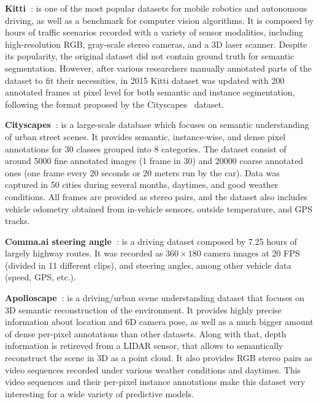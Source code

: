 \vspace*{0.1cm}\noindent\textbf{Kitti~\cite{Geiger2013}}: is one of the most popular datasets for mobile robotics and autonomous driving, as well as a benchmark for computer vision algorithms. It is composed by hours of traffic scenarios recorded with a variety of sensor modalities, including high-resolution RGB, gray-scale stereo cameras, and a 3D laser scanner. Despite its popularity, the original dataset did not contain ground truth for semantic segmentation. However, after various researchers manually annotated parts of the dataset to fit their necessities, in 2015 Kitti dataset was updated with 200 annotated frames at pixel level for both semantic and instance segmentation, following the format proposed by the Cityscapes~\cite{Cordts2016} dataset.

\vspace*{0.1cm}\noindent\textbf{Cityscapes~\cite{Cordts2016}}: is a large-scale database which focuses on semantic understanding of urban street scenes. It provides semantic, instance-wise, and dense pixel annotations for \num{30} classes grouped into \num{8} categories. The dataset consist of around \num{5000} fine annotated images (\num{1} frame in \num{30}) and \num{20000} coarse annotated ones (one frame every \num{20} seconds or \num{20} meters run by the car). Data was captured in \num{50} cities during several months, daytimes, and good weather conditions. All frames are provided as stereo pairs, and the dataset also includes vehicle odometry obtained from in-vehicle sensors, outside temperature, and GPS tracks.

\vspace*{0.1cm}\noindent\textbf{Comma.ai steering angle~\cite{Santana2016}}: is a driving dataset composed by \num{7.25} hours of largely highway routes. It was recorded as $360 \times 180$ camera images at 20 \ac{FPS} (divided in \num{11} different clips), and steering angles, among other vehicle data (speed, GPS, etc.).

\vspace*{0.1cm}\noindent\textbf{Apolloscape~\cite{Huang2018a}}: is a driving/urban scene understanding dataset that focuses on 3D semantic reconstruction of the environment. It provides highly precise information about location and 6D camera pose, as well as a much bigger amount of dense per-pixel annotations than other datasets. Along with that, depth information is retireved from a LIDAR sensor, that allows to semantically reconstruct the scene in 3D as a point cloud. It also provides RGB stereo pairs as video sequences recorded under various weather conditions and daytimes. This video sequences and their per-pixel instance annotations make this dataset very interesting for a wide variety of predictive models.

